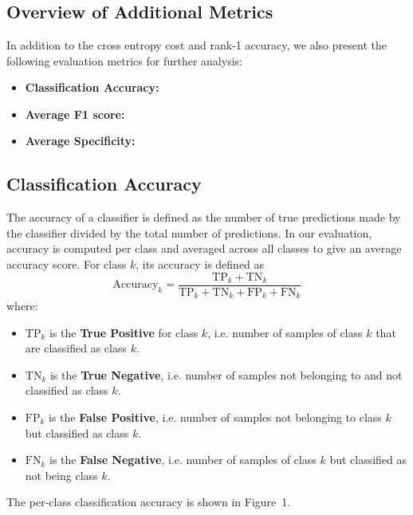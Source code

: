 \documentclass[]{report}   %
\begin{document}
\newpage
\section*{\color{blue}{Task 3 - Species Classification}}
\subsection*{Overview of Additional Metrics}
In addition to the cross entropy cost and rank-1 accuracy, we also present the following evaluation metrics for further analysis:
\begin{itemize}
\item[] \textbf{Classification Accuracy:} 
\item[] \textbf{Average F1 score:} 
\item[] \textbf{Average Specificity:} 
\end{itemize}

\subsection*{Classification Accuracy}
The accuracy of a classifier is defined as the number of true predictions made by the
classifier divided by the total number of predictions. In our evaluation, accuracy
is computed per class and averaged across all classes to give an average accuracy
score. For class $k$, its accuracy is defined as
\begin{equation}
\textrm{Accuracy}_k = \frac{\textrm{TP}_k+\textrm{TN}_k}{\textrm{TP}_k+\textrm{TN}_k+\textrm{FP}_k+\textrm{FN}_k}
\end{equation}
where:
\begin{itemize}
\item $\textrm{TP}_k$ is the \textbf{True Positive} for class $k$, i.e. number of samples of class $k$ that are classified as class $k$.
\item $\textrm{TN}_k$ is the \textbf{True Negative}, i.e. number of samples not belonging to and not classified as class $k$.
\item $\textrm{FP}_k$ is the \textbf{False Positive}, i.e. number of samples not belonging to class $k$ but classified as class $k$.
\item $\textrm{FN}_k$ is the \textbf{False Negative}, i.e. number of samples of class $k$ but classified as not being class $k$.
\end{itemize}
The per-class classification accuracy is shown in Figure~1.
\newpage
\end{document}
